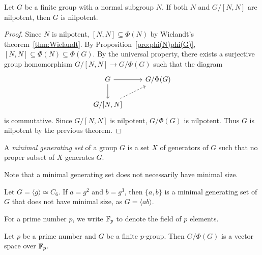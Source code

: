 
\begin{theorem}[Hall]
\label{thm:Hall_nilpotent}
Let $G$ be a finite group with a normal subgroup $N$. If both $N$ and 
$G/[N,N]$ are nilpotent, then $G$ is nilpotent.
\end{theorem}

\begin{proof}
Since $N$ is nilpotent, $[N,N]\subseteq\Phi(N)$ by 
Wielandt's theorem~\ref{thm:Wielandt}. 
By Proposition~\ref{pro:phi(N)phi(G)},
$[N,N]\subseteq\Phi(N)\subseteq\Phi(G)$. 
By the universal property, there exists a surjective group homomorphism 
$G/[N,N]\to G/\Phi(G)$ such that the diagram 
    \[
    \begin{tikzcd}
	G & {G/\Phi(G)} \\
	{G/[N,N]}
	\arrow[from=1-1, to=1-2]
	\arrow[from=1-1, to=2-1]
	\arrow[dashed, from=2-1, to=1-2]
    \end{tikzcd}
    \]
is commutative. Since $G/[N,N]$ is nilpotent, $G/\Phi(G)$ is nilpotent. Thus $G$ is nilpotent by the previous theorem. 
\end{proof}

\begin{definition}
A \emph{minimal generating set} of a group $G$ is a set 
$X$ of generators of $G$ such that no proper subset of $X$ generates $G$. 
\end{definition}

Note that a minimal generating set does not necessarily have minimal size. 
	
\begin{example}
Let $G=\langle g\rangle\simeq C_6$.  If $a=g^2$ and 
$b=g^3$, then $\{a,b\}$ is a minimal generating set of $G$ that does not have
minimal size, as $G=\langle ab\rangle$.
\end{example}
	
For a prime number $p$, we write $\mathbb{F}_p$ to denote the field of $p$ elements. 

\begin{lemma}
\label{lem:Burnside:minimal}
Let $p$ be a prime number and 
$G$ be a finite $p$-group. Then $G/\Phi(G)$ is a vector space over $\mathbb{F}_p$.
\end{lemma}

